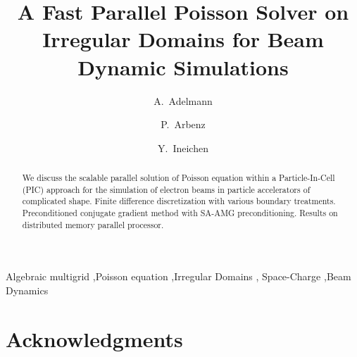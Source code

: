 \documentclass[a4paper,10pt,twocolumn,5p,preprint,pdftex]{elsarticle}
\title{A Fast Parallel Poisson Solver on Irregular Domains for Beam
  Dynamic Simulations}
\author[psi]{A.~Adelmann}
\author[eth]{P.~Arbenz}
\author[eth]{Y.~Ineichen}
\begin{document}
\begin{keyword}
  Algebraic multigrid \sep Poisson equation \sep Irregular Domains \sep
  Space-Charge \sep Beam Dynamics
\end{keyword}

\begin{abstract}
  We discuss the scalable parallel solution of Poisson equation within a
  Particle-In-Cell (PIC) approach for the simulation of electron beams
  in particle accelerators of complicated shape.  Finite difference
  discretization with various boundary treatments.  Preconditioned
  conjugate gradient method with SA-AMG preconditioning.  Results on
  distributed memory parallel processor.
\end{abstract}

\maketitle















\section*{Acknowledgments}




\end{document}
